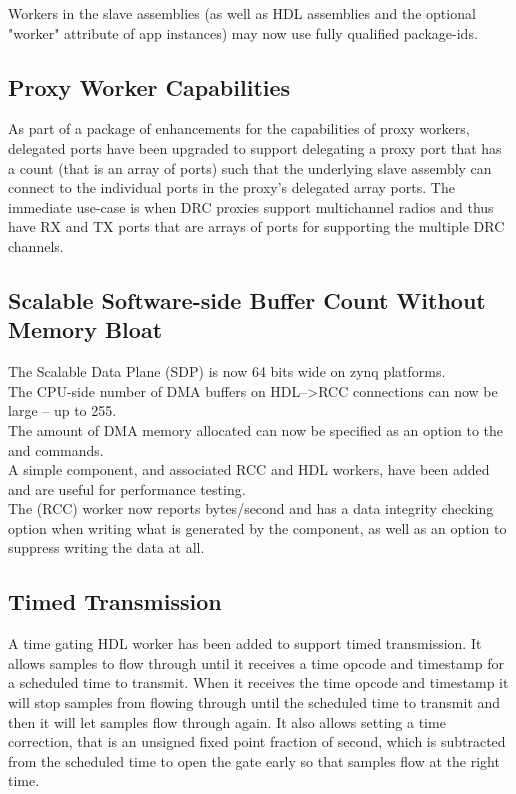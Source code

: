 Workers in the slave assemblies (as well as HDL assemblies and the optional "worker" attribute of app instances) may now use fully qualified package-ids.

\subsection{Proxy Worker Capabilities}
\label{sec:21_proxy_capabilities}
As part of a package of enhancements for the capabilities of proxy workers,
delegated ports have been upgraded to support delegating a proxy port that
has a count (that is an array of ports) such that the underlying slave
assembly can connect to the individual ports in the proxy's delegated array
ports.  The immediate use-case is when DRC proxies support multichannel
radios and thus have RX and TX ports that are arrays of ports for supporting
the multiple DRC channels.

\subsection{Scalable Software-side Buffer Count Without Memory Bloat}
\label{sec:21_sdp_width}
The Scalable Data Plane (SDP) is now 64 bits wide on zynq platforms.\\

The CPU-side number of DMA buffers on HDL--\textgreater RCC connections can now be large -- up to 255.\\

The amount of DMA memory allocated can now be specified as an option to the  and  commands.\\

A simple  component, and associated RCC and HDL workers, have been added and are useful for performance testing.\\

The  (RCC) worker now reports bytes/second and has a data integrity checking option when writing what is generated by the  component, as well as an option to suppress writing the data at all.

\subsection{Timed Transmission}
\label{sec:21_timed_xmit}
A time gating HDL worker has been added to support timed transmission.
It allows samples to flow through until it receives a time opcode and
timestamp for a scheduled time to transmit. When it receives the time
opcode and timestamp it will stop samples from flowing through until
the scheduled time to transmit and then it will let samples flow through
again. It also allows setting a time correction, that is an unsigned
fixed point fraction of second, which is subtracted from the scheduled
time to open the gate early so that samples flow at the right time.

